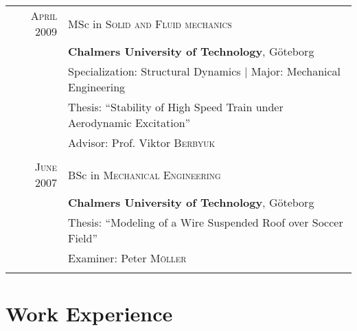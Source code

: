 \documentclass[a4paper,10pt]{article} %
\begin{document}
{\begin{tabular}{rl}

\textsc{April} 2009 & MSc in \textsc{Solid and Fluid mechanics}\\
& \textbf{Chalmers University of Technology}, Göteborg\\
& Specialization: Structural Dynamics | Major: Mechanical Engineering\\
& Thesis: ``Stability of High Speed Train under Aerodynamic Excitation''\\
& \small Advisor: Prof. Viktor \textsc{Berbyuk}\\
&\\


\textsc{June} 2007 & BSc in \textsc{Mechanical Engineering}\\
& \textbf{Chalmers University of Technology}, Göteborg\\
& Thesis: ``Modeling of a Wire Suspended Roof over Soccer Field''\\
& \small Examiner: Peter \textsc{Möller}\\
&\\

\end{tabular}


\section{Work Experience}

}
\end{document}
